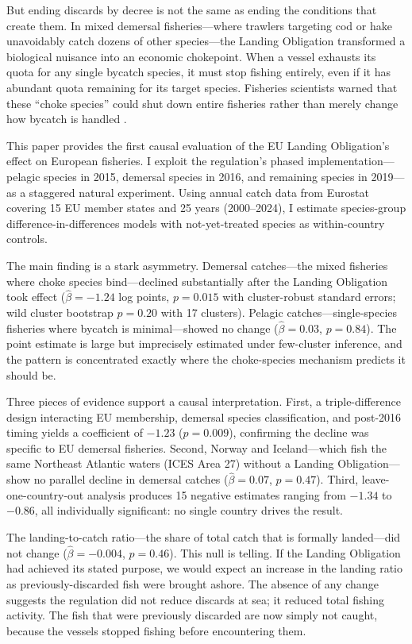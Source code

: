 \documentclass[12pt]{article}
\begin{document}
But ending discards by decree is not the same as ending the conditions that create them. In mixed demersal fisheries---where trawlers targeting cod or hake unavoidably catch dozens of other species---the Landing Obligation transformed a biological nuisance into an economic chokepoint. When a vessel exhausts its quota for any single bycatch species, it must stop fishing entirely, even if it has abundant quota remaining for its target species. Fisheries scientists warned that these ``choke species'' could shut down entire fisheries rather than merely change how bycatch is handled \citep{baudron2019choke, rihan2019landing}.

This paper provides the first causal evaluation of the EU Landing Obligation's effect on European fisheries. I exploit the regulation's phased implementation---pelagic species in 2015, demersal species in 2016, and remaining species in 2019---as a staggered natural experiment. Using annual catch data from Eurostat covering 15 EU member states and 25 years (2000--2024), I estimate species-group difference-in-differences models with not-yet-treated species as within-country controls.

The main finding is a stark asymmetry. Demersal catches---the mixed fisheries where choke species bind---declined substantially after the Landing Obligation took effect ($\hat{\beta} = -1.24$ log points, $p = 0.015$ with cluster-robust standard errors; wild cluster bootstrap $p = 0.20$ with 17 clusters). Pelagic catches---single-species fisheries where bycatch is minimal---showed no change ($\hat{\beta} = 0.03$, $p = 0.84$). The point estimate is large but imprecisely estimated under few-cluster inference, and the pattern is concentrated exactly where the choke-species mechanism predicts it should be.

Three pieces of evidence support a causal interpretation. First, a triple-difference design interacting EU membership, demersal species classification, and post-2016 timing yields a coefficient of $-1.23$ ($p = 0.009$), confirming the decline was specific to EU demersal fisheries. Second, Norway and Iceland---which fish the same Northeast Atlantic waters (ICES Area 27) without a Landing Obligation---show no parallel decline in demersal catches ($\hat{\beta} = 0.07$, $p = 0.47$). Third, leave-one-country-out analysis produces 15 negative estimates ranging from $-1.34$ to $-0.86$, all individually significant: no single country drives the result.

The landing-to-catch ratio---the share of total catch that is formally landed---did not change ($\hat{\beta} = -0.004$, $p = 0.46$). This null is telling. If the Landing Obligation had achieved its stated purpose, we would expect an increase in the landing ratio as previously-discarded fish were brought ashore. The absence of any change suggests the regulation did not reduce discards at sea; it reduced total fishing activity. The fish that were previously discarded are now simply not caught, because the vessels stopped fishing before encountering them.
\end{document}
